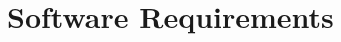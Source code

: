 \documentclass{InsightArticle}
\begin{document}
\section{Software Requirements}





\end{document}
